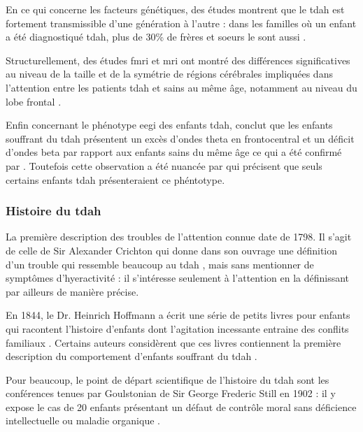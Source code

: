 En ce qui concerne les facteurs génétiques, des études montrent que le \gls{tdah} est fortement transmissible d'une génération à l'autre \citep{Larsson2014} :
dans les familles où un enfant a été diagnostiqué \gls{tdah}, plus de 30\% de frères et soeurs le sont aussi \citep{Monastra2005}.

Structurellement, des études \gls{fmri} et \gls{mri} ont montré des différences significatives au niveau de la taille et de la symétrie de régions cérébrales impliquées
dans l'attention entre les patients \gls{tdah} et sains au même âge, notamment au niveau du lobe frontal \citep{Monastra2005}.  

Enfin concernant le phénotype \gls{eegi} des enfants \gls{tdah}, \citet{Lubar1991} conclut que les enfants souffrant du \gls{tdah} présentent un excès 
d'ondes theta en frontocentral \citep{Loo2010} et un déficit d'ondes beta par rapport aux enfants sains du même âge ce qui a été confirmé par \citet{Barry2003}. Toutefois cette observation 
a été nuancée par \citet{Arns2012} qui précisent que seuls certains enfants \gls{tdah} présenteraient ce phéntotype. 

\subsubsection{Histoire du \gls{tdah}} \label{adhd_history}

La première description des troubles de l'attention connue date de 1798. Il s'agit de celle de Sir Alexander Crichton qui donne dans son ouvrage 
une définition d'un trouble 
qui ressemble beaucoup au \gls{tdah} \citep{Crichton1798}, mais sans mentionner de symptômes d'hyeractivité : il s'intéresse seulement à l'attention
en la définissant par ailleurs de manière précise. 

En 1844, le Dr. Heinrich Hoffmann a écrit une série de petits livres pour enfants qui racontent l'histoire d'enfants dont l'agitation incessante 
entraine des conflits familiaux \citep{Lange2010}. Certains auteurs considèrent que ces livres contiennent la première description du comportement d'enfants 
souffrant du \gls{tdah} \citep{Burd1988, Kopf2006}.  

Pour beaucoup, le point de départ scientifique de l'histoire du \gls{tdah} sont les conférences tenues par Goulstonian de Sir George Frederic Still 
en 1902 \citep{Barkley2006, Conners2000, Palmer2001, Rafalovich2001} : il y expose le cas de 20 enfants présentant un défaut de contrôle moral sans
déficience intellectuelle ou maladie organique \citep{Still1902}. 

